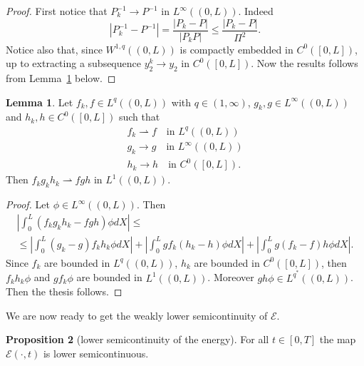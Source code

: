 \documentclass[a4paper,10pt,twoside]{amsbook}
\numberwithin{section}{chapter}
\numberwithin{equation}{chapter}
\theoremstyle{definition}
\newtheorem{prop}{Proposition}[chapter]
\newtheorem{lemma}[prop]{Lemma}
\begin{document}
\begin{proof}
First notice that $P_k^{-1}\to P^{-1}$ in $L^\infty((0,L))$. Indeed
\[
|P_k^{-1}-P^{-1}|=\frac{|P_k-P|}{|P_kP|}\le\frac{|P_k-P|}{\Pi^2}.
\]
Notice also that, since $W^{1,q}((0,L))$ is compactly embedded in $C^0([0,L])$, up to extracting a subsequence $y_2^k\to y_2$ in $C^0([0,L])$. Now the results follows from Lemma~\ref{lemma:lemmetto-cretino} below.
\end{proof}
\begin{lemma}
\label{lemma:lemmetto-cretino}
Let $f_k,f\in L^q((0,L))$  with $q\in(1,\infty)$, $g_k,g\in L^\infty((0,L))$ and $h_k,h\in C^0([0,L])$ such that
\begin{gather*}
f_k\rightharpoonup f\quad\text{in $L^q((0,L))$} \\
g_k\to g\quad\text{in $L^\infty((0,L))$} \\
h_k\to h\quad\text{in $C^0([0,L])$}.
\end{gather*}
Then $f_kg_kh_k\rightharpoonup fgh$ in $L^1((0,L))$.
\end{lemma}
\begin{proof}
Let $\phi\in L^\infty((0,L))$. Then
\begin{multline*}
\left|\int_0^L(f_kg_kh_k-fgh)\phi dX\right|\le\\
\le\left|\int_0^L(g_k-g)f_kh_k\phi dX\right|+\left|\int_0^Lgf_k(h_k-h)\phi dX\right|+\left|\int_0^Lg(f_k-f)h\phi dX\right|.
\end{multline*}
Since $f_k$ are bounded in $L^q((0,L))$, $h_k$ are bounded in $C^0([0,L])$, then $f_kh_k\phi$ and $gf_k\phi$ are bounded in $L^1((0,L))$. Moreover $gh\phi\in L^{q^*}((0,L))$. Then the thesis follows.
\end{proof}
We are now ready to get the weakly lower semicontinuity of $\mathcal{E}$.
\begin{prop}[lower semicontinuity of the energy]
For all $t\in[0,T]$ the map $\mathcal{E}(\cdot,t)$ is lower semicontinuous.
\end{prop}
\end{document}
